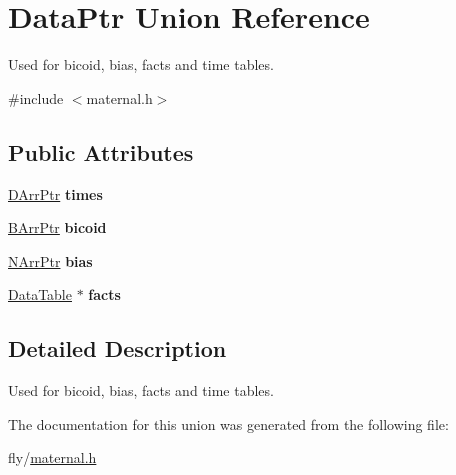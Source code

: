 \hypertarget{unionDataPtr}{
\section{DataPtr Union Reference}
\label{unionDataPtr}
}


Used for bicoid, bias, facts and time tables.  


{\ttfamily \#include $<$maternal.h$>$}\subsection*{Public Attributes}
\begin{DoxyCompactItemize}
\item 
\hypertarget{unionDataPtr_ac6cfd3921fbcaf7c9324e60a2e616255}{
\hyperlink{structDArrPtr}{DArrPtr} {\bfseries times}}
\label{unionDataPtr_ac6cfd3921fbcaf7c9324e60a2e616255}

\item 
\hypertarget{unionDataPtr_a64dc506db078f3161119a352d47cd4c2}{
\hyperlink{structBArrPtr}{BArrPtr} {\bfseries bicoid}}
\label{unionDataPtr_a64dc506db078f3161119a352d47cd4c2}

\item 
\hypertarget{unionDataPtr_a41cba5f9e63bb19bbccabff185c9e406}{
\hyperlink{structNArrPtr}{NArrPtr} {\bfseries bias}}
\label{unionDataPtr_a41cba5f9e63bb19bbccabff185c9e406}

\item 
\hypertarget{unionDataPtr_ad5ba51d572aa7b8d4f7f9317b4c0f1dc}{
\hyperlink{structDataTable}{DataTable} $\ast$ {\bfseries facts}}
\label{unionDataPtr_ad5ba51d572aa7b8d4f7f9317b4c0f1dc}

\end{DoxyCompactItemize}


\subsection{Detailed Description}
Used for bicoid, bias, facts and time tables. 

The documentation for this union was generated from the following file:\begin{DoxyCompactItemize}
\item 
fly/\hyperlink{maternal_8h}{maternal.h}\end{DoxyCompactItemize}
